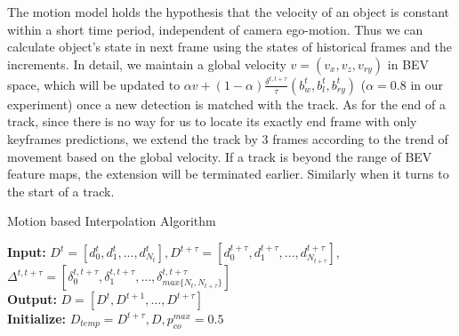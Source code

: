 \documentclass[letterpaper, 10pt, conference]{ieeeconf}  %
\begin{document}
The motion model holds the hypothesis that the velocity of an object is constant within a short time period, independent of camera ego-motion. Thus we can calculate object's state in next frame using the states of historical frames and the increments. In detail, we maintain a global velocity $v = (v_x, v_z, v_{ry})$ in BEV space, which will be updated to $\alpha v + (1-\alpha) \frac{\delta^{t, t+\tau}}{\tau}(b^t_w, b^t_l, b^t_{ry})$ ($\alpha = 0.8$ in our experiment) once a new detection is matched with the track. As for the end of a track, since there is no way for us to locate its exactly end frame with only keyframes predictions, we extend the track by 3 frames according to the trend of movement based on the global velocity. If a track is beyond the range of BEV feature maps, the extension will be terminated earlier. Similarly when it turns to the start of a track.

\begin{algorithm}
	\vspace{0.05cm}
	\small
	\caption{Motion based Interpolation Algorithm}
	\label{alg:interpolation}
	\textbf{Input: } $D^t= [d^t_0, d^t_1, ..., d^t_{N_t}], D^{t+\tau}= [d^{t+\tau}_0, d^{t+\tau}_1, ..., d^{t+\tau}_{N_{t+\tau}}],$
	$\Delta^{t, t+\tau}=[\delta^{t, t+\tau}_0, \delta^{t, t+\tau}_1, ..., \delta^{t, t+\tau}_{max\{N_t, N_{t+\tau}\}}]$\\
	\textbf{Output: } $D = [D^t, D^{t+1}, ..., D^{t+\tau}]$\\
	\textbf{Initialize:} $D_{temp} = D^{t+\tau}, D, p_{co}^{max} = 0.5$ \\
\end{algorithm}
\setlength{\textfloatsep}{1pt}%
\end{document}
